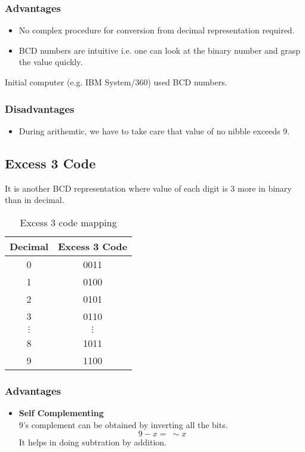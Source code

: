 \documentclass[oneside]{book}
\begin{document}
\subsubsection{Advantages}
\begin{itemize}
	\item No complex procedure for conversion from decimal representation required.
	\item BCD numbers are intuitive i.e. one can look at the binary number and grasp the value quickly.
\end{itemize}
Initial computer (e.g. IBM System/360) used BCD numbers.
\subsubsection{Disadvantages}
\begin{itemize}
	\item During arithemtic, we have to take care that value of no nibble exceeds 9.
\end{itemize}

\subsection{Excess 3 Code}
It is another BCD representation where value of each digit is 3 more in binary than in decimal.
\begin{table}[ht]
	\centering
	\begin{tabular}{|cc|}
		\hline
		Decimal    & Excess 3 Code \\
		\hline
		0          & 0011          \\
		1          & 0100          \\
		2          & 0101          \\
		3          & 0110          \\
		\(\vdots\) & \(\vdots\)    \\
		8          & 1011          \\
		9          & 1100          \\
		\hline
	\end{tabular}
	\caption{Excess 3 code mapping}
\end{table}
\subsubsection{Advantages}
\begin{itemize}
	\item \textbf{Self Complementing}\\
	      9's complement can be obtained by inverting all the bits.
	      \[
		      9 - x =\ \sim x
	      \]
	      It helps in doing subtration by addition.
\end{itemize}
\end{document}
